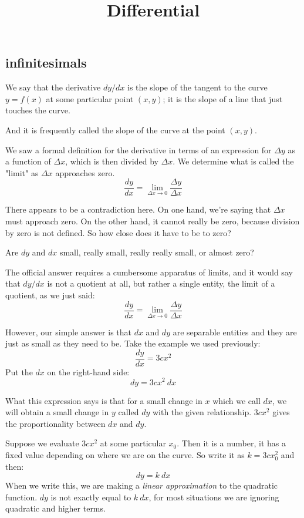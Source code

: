\documentclass[11pt, oneside]{article}
\title{Differential}
\date{}
\begin{document}
\maketitle
\Large

\subsection*{infinitesimals}
We say that the derivative $dy/dx$ is the slope of the tangent to the curve $y = f(x)$ at some particular point $(x,y)$;  it is the slope of a line that just touches the curve.

And it is frequently called the slope of the curve at the point $(x,y)$.

We saw a formal definition for the derivative in terms of an expression for $\Delta y$ as a function of $\Delta x$, which is then divided by $\Delta x$.  We determine what is called the "limit" as $\Delta x$ approaches zero.
\[ \frac{dy}{dx} = \lim_{\Delta x \rightarrow 0} \frac{\Delta y}{\Delta x} \]

There appears to be a contradiction here.  On one hand, we're saying that $\Delta x$ must approach zero.  On the other hand, it cannot really be zero, because division by zero is not defined.  So how close does it have to be to zero?  

Are $dy$ and $dx$ small, really small, really really small, or almost zero?  

The official answer requires a cumbersome apparatus of limits, and it would say that $dy/dx$ is not a quotient at all, but rather a single entity, the limit of a quotient, as we just said:
\[ \frac{dy}{dx} = \lim_{\Delta x \rightarrow 0} \frac{\Delta y}{\Delta x} \]

However, our simple answer is that $dx$ and $dy$ are separable entities and they are just as small as they need to be.  Take the example we used previously:
 \[ \frac{dy}{dx} = 3cx^2 \]
Put the $dx$ on the right-hand side:
\[ dy = 3cx^2 \ dx \]

What this expression says is that for a small change in $x$ which we call $dx$, we will obtain a small change in $y$ called $dy$ with the given relationship.  $3cx^2$ gives the proportionality between $dx$ and $dy$.

Suppose we evaluate $3cx^2$ at some particular $x_0$.  Then it is a number, it has a fixed value depending on where we are on the curve.  So write it as $k = 3cx_0^2$ and then:
\[ dy = k \ dx \]
When we write this, we are making a \emph{linear approximation} to the quadratic function.  $dy$ is not exactly equal to $k \ dx$, for most situations we are ignoring quadratic and higher terms.
\end{document}
